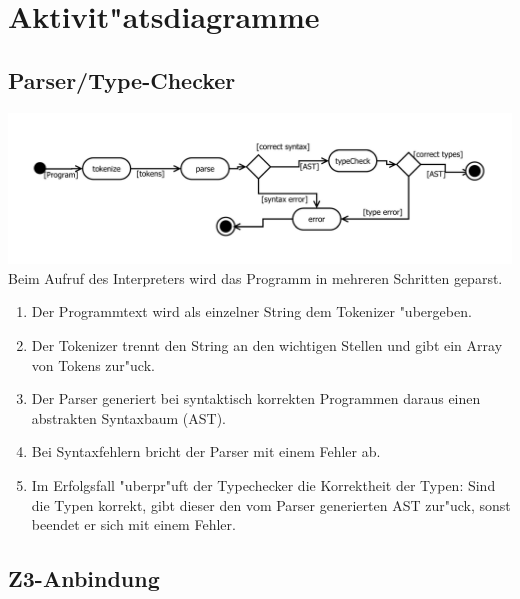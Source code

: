 \documentclass[10pt,a4paper,titlepage]{article}
\begin{document}
\newpage

\section{Aktivit"atsdiagramme}

\subsection{Parser/Type-Checker}

\includegraphics[scale=0.8]{images/AktivitaetParser.pdf}\newline
Beim Aufruf des Interpreters wird das Programm in mehreren Schritten geparst.
\begin{enumerate}
\item Der Programmtext wird als einzelner String dem Tokenizer "ubergeben.
\item Der Tokenizer trennt den String an den wichtigen Stellen und gibt ein Array von Tokens zur"uck.
\item Der Parser generiert bei syntaktisch korrekten Programmen daraus einen abstrakten Syntaxbaum (AST).
\item Bei Syntaxfehlern bricht der Parser mit einem Fehler ab.
\item Im Erfolgsfall "uberpr"uft der Typechecker die Korrektheit der Typen: Sind die Typen korrekt, gibt dieser den vom Parser generierten AST zur"uck, sonst beendet er sich mit einem Fehler.
\end{enumerate}

\subsection{Z3-Anbindung}
\end{document}
